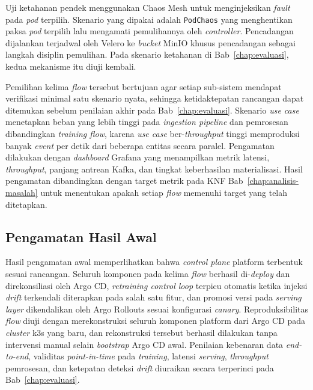 Uji ketahanan pendek menggunakan Chaos Mesh \autocite{chaosmesh2025} untuk menginjeksikan \textit{fault} pada \textit{pod} terpilih. Skenario yang dipakai adalah \texttt{PodChaos} yang menghentikan paksa \textit{pod} terpilih lalu mengamati pemulihannya oleh \textit{controller}. Pencadangan dijalankan terjadwal oleh Velero \autocite{velero2025} ke \textit{bucket} MinIO khusus pencadangan sebagai langkah disiplin pemulihan. Pada skenario ketahanan di Bab~\ref{chap:evaluasi}, kedua mekanisme itu diuji kembali.

Pemilihan kelima \textit{flow} tersebut bertujuan agar setiap sub-sistem mendapat verifikasi minimal satu skenario nyata, sehingga ketidaktepatan rancangan dapat ditemukan sebelum penilaian akhir pada Bab~\ref{chap:evaluasi}. Skenario \textit{use case} menetapkan beban yang lebih tinggi pada \textit{ingestion pipeline} dan pemrosesan dibandingkan \textit{training flow}, karena \textit{use case} ber-\textit{throughput} tinggi memproduksi banyak \textit{event} per detik dari beberapa entitas secara paralel. Pengamatan dilakukan dengan \textit{dashboard} Grafana yang menampilkan metrik latensi, \textit{throughput}, panjang antrean Kafka, dan tingkat keberhasilan materialisasi. Hasil pengamatan dibandingkan dengan target metrik pada KNF Bab~\ref{chap:analisis-masalah} untuk menentukan apakah setiap \textit{flow} memenuhi target yang telah ditetapkan.

\subsection{Pengamatan Hasil Awal}
\label{subsec:pengamatan-awal}

Hasil pengamatan awal memperlihatkan bahwa \textit{control plane} platform terbentuk sesuai rancangan. Seluruh komponen pada kelima \textit{flow} berhasil di-\textit{deploy} dan direkonsiliasi oleh Argo CD, \textit{retraining control loop} terpicu otomatis ketika injeksi \textit{drift} terkendali diterapkan pada salah satu fitur, dan promosi versi pada \textit{serving layer} dikendalikan oleh Argo Rollouts sesuai konfigurasi \textit{canary}. Reproduksibilitas \textit{flow} diuji dengan merekonstruksi seluruh komponen platform dari Argo CD pada \textit{cluster} k3s yang baru, dan rekonstruksi tersebut berhasil dilakukan tanpa intervensi manual selain \textit{bootstrap} Argo CD awal. Penilaian kebenaran data \textit{end-to-end}, validitas \textit{point-in-time} pada \textit{training}, latensi \textit{serving}, \textit{throughput} pemrosesan, dan ketepatan deteksi \textit{drift} diuraikan secara terperinci pada Bab~\ref{chap:evaluasi}.

